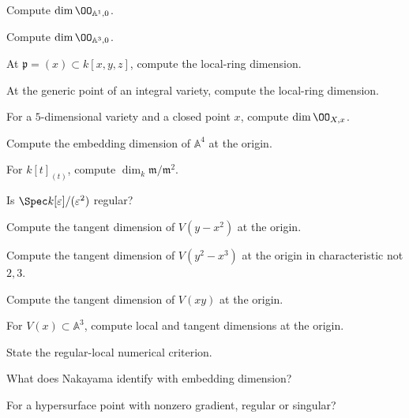 \begin{exercise}[VI.32.E1] Compute $\dim\OO_{\mathbb A^1,0}$.\end{exercise}
\begin{exercise}[VI.32.E2] Compute $\dim\OO_{\mathbb A^3,0}$.\end{exercise}
\begin{exercise}[VI.32.E3] At $\mathfrak p=(x)\subset k[x,y,z]$, compute the local-ring dimension.\end{exercise}
\begin{exercise}[VI.32.E4] At the generic point of an integral variety, compute the local-ring dimension.\end{exercise}
\begin{exercise}[VI.32.E5] For a $5$-dimensional variety and a closed point $x$, compute $\dim\OO_{X,x}$.\end{exercise}
\begin{exercise}[VI.32.E6] Compute the embedding dimension of $\mathbb A^4$ at the origin.\end{exercise}
\begin{exercise}[VI.32.E7] For $k[t]_{(t)}$, compute $\dim_k\mathfrak m/\mathfrak m^2$.\end{exercise}
\begin{exercise}[VI.32.E8] Is $\Spec k[\varepsilon]/(\varepsilon^2)$ regular?\end{exercise}
\begin{exercise}[VI.32.E9] Compute the tangent dimension of $V(y-x^2)$ at the origin.\end{exercise}
\begin{exercise}[VI.32.E10] Compute the tangent dimension of $V(y^2-x^3)$ at the origin in characteristic not $2,3$.\end{exercise}
\begin{exercise}[VI.32.E11] Compute the tangent dimension of $V(xy)$ at the origin.\end{exercise}
\begin{exercise}[VI.32.E12] For $V(x)\subset\mathbb A^3$, compute local and tangent dimensions at the origin.\end{exercise}
\begin{exercise}[VI.32.E13] State the regular-local numerical criterion.\end{exercise}
\begin{exercise}[VI.32.E14] What does Nakayama identify with embedding dimension?\end{exercise}
\begin{exercise}[VI.32.E15] For a hypersurface point with nonzero gradient, regular or singular?\end{exercise}

